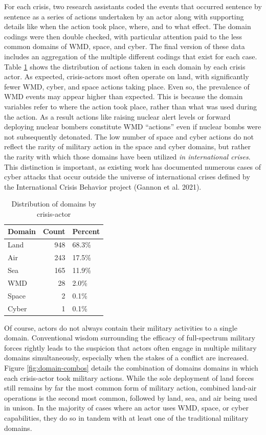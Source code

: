 \documentclass[
]{article}
\begin{document}
For each crisis, two research assistants coded the events that occurred sentence by sentence as a series of actions undertaken by an actor along with supporting details like when the action took place, where, and to what effect. The domain codings were then double checked, with particular attention paid to the less common domains of WMD, space, and cyber. The final version of these data includes an aggregation of the multiple different codings that exist for each case. Table \ref{tab:domain-count} shows the distribution of actions taken in each domain by each crisis actor. As expected, crisis-actors most often operate on land, with significantly fewer WMD, cyber, and space actions taking place. Even so, the prevalence of WMD events may appear higher than expected. This is because the domain variables refer to where the action took place, rather than what was used during the action. As a result actions like raising nuclear alert levels or forward deploying nuclear bombers constitute WMD ``actions'' even if nuclear bombs were not subsequently detonated. The low number of space and cyber actions do not reflect the rarity of military action in the space and cyber domains, but rather the rarity with which those domains have been utilized \textit{in international crises}. This distinction is important, as existing work has documented numerous cases of cyber attacks that occur outside the universe of international crises defined by the International Crisis Behavior project (Gannon et al. 2021).

\begin{table}[H]

\caption{\label{tab:domain-count}Distribution of domains by crisis-actor}
\centering
\begin{tabular}[t]{l|r|l}
\hline
\textbf{Domain} & \textbf{Count} & \textbf{Percent}\\
\hline
Land & 948 & 68.3\%\\
\hline
Air & 243 & 17.5\%\\
\hline
Sea & 165 & 11.9\%\\
\hline
WMD & 28 & 2.0\%\\
\hline
Space & 2 & 0.1\%\\
\hline
Cyber & 1 & 0.1\%\\
\hline
\end{tabular}
\end{table}

Of course, actors do not always contain their military activities to a single domain. Conventional wisdom surrounding the efficacy of full-spectrum military forces rightly leads to the suspicion that actors often engage in multiple military domains simultaneously, especially when the stakes of a conflict are increased. Figure \ref{fig:domain-combos} details the combination of domains domains in which each crisis-actor took military actions. While the sole deployment of land forces still remains by far the most common form of military action, combined land-air operations is the second most common, followed by land, sea, and air being used in unison. In the majority of cases where an actor uses WMD, space, or cyber capabilities, they do so in tandem with at least one of the traditional military domains.
\end{document}
